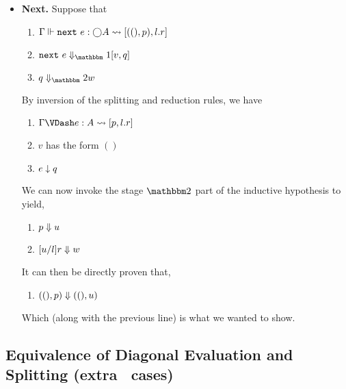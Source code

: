 \documentclass{article}
\begin{document}
\begin{itemize}
\item {\bf Next.} Suppose that
\begin{enumerate}
\item ${\Gamma} \Vdash {{\tt next}~e}:{\bigcirc A} \rightsquigarrow \left[{((),p),l.r}\right]$
\item $\rsone{\next~e}{v}{q}$
\item $\reducetwo{q}{w}$
\end{enumerate}
By inversion of the splitting and reduction rules, we have
\begin{enumerate}
\item $\splittwo {e}{A}{p,l.r}$
\item $v$ has the form $()$
\item ${e} \downarrow {q}$
\end{enumerate}
We can now invoke the stage $\bbtwo$ part of the inductive hypothesis to yield,
\begin{enumerate}
\item ${p} \Downarrow {u}$
\item ${[u/l]r} \Downarrow {w}$
\end{enumerate}
It can then be directly proven that,
\begin{enumerate}
\item ${((),p)} \Downarrow {((),u)}$
\end{enumerate}
Which (along with the previous line) is what we wanted to show.

\end{itemize}

\subsection {Equivalence of Diagonal Evaluation and Splitting (extra \lamStaged~cases)}



\end{document}
